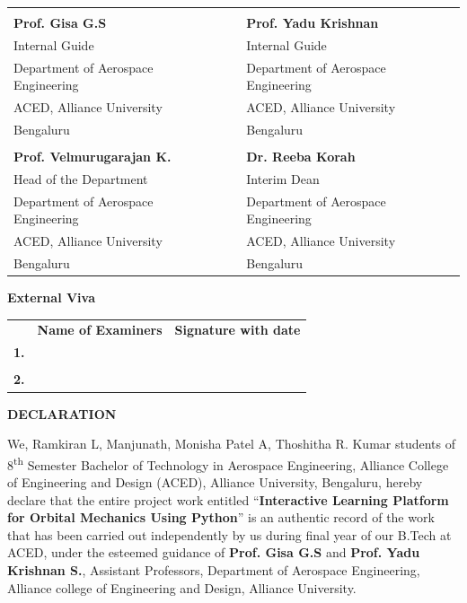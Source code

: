 \documentclass[12pt]{article}
\begin{document}
\begin{center}
\begin{tabular}{K{7cm} K{0.5cm} K{7cm}}
\underline{\hspace{2.9cm}} & & \underline{\hspace{4.3cm}} \\ 
\textbf{Prof. Gisa G.S} & & \textbf{Prof. Yadu Krishnan} \vspace{1em}\\ 
Internal Guide & &  Internal Guide\\ 
Department of Aerospace Engineering & & Department of Aerospace Engineering \\
ACED, Alliance University & & ACED, Alliance University \\ 
Bengaluru & & Bengaluru \vspace{3em}\\ 
\underline{\hspace{5cm}}&&\underline{\hspace{3.5cm}}\\ 
\textbf{Prof. Velmurugarajan K.}&&\textbf{Dr. Reeba Korah}\vspace{1em} \\ 
Head of the Department&&Interim Dean \\ 
Department of Aerospace Engineering&&Department of Aerospace Engineering\\
ACED, Alliance University&&ACED, Alliance University\\ 
Bengaluru&&Bengaluru\vspace{2em}\\ 
\end{tabular} 
\end{center}
\textbf{External Viva}
\begin{center}
\begin{tabular}{c K{7cm} K{7cm}}
 & \textbf{Name of Examiners} & \textbf{Signature with date} \\
\textbf{1.} & & \\ 
&&\\
\textbf{2.} & & \\
\end{tabular}
\end{center}
\thispagestyle{empty}
\newpage
\begin{center}
\Large \textbf{DECLARATION}
\end{center}
\normalsize
\hspace{4em}We, Ramkiran L, Manjunath, Monisha Patel A, Thoshitha R. Kumar students of 8\textsuperscript{th} Semester Bachelor of Technology in Aerospace Engineering, Alliance College of Engineering and Design (ACED), Alliance University, Bengaluru, hereby declare that the entire project work entitled \enquote{\textbf{Interactive Learning Platform for Orbital Mechanics Using Python}} is an authentic record of the work that has been carried out independently by us during final year of our B.Tech at ACED, under the esteemed guidance of \textbf{Prof. Gisa G.S} and \textbf{Prof. Yadu Krishnan S.}, Assistant Professors, Department of Aerospace Engineering, Alliance college of Engineering and Design, Alliance University. \par
\end{document}
